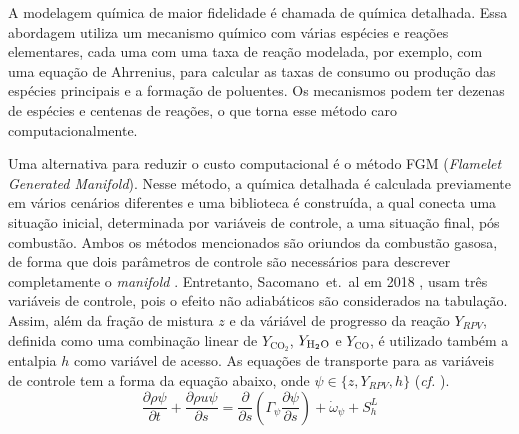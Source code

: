 A modelagem química de maior fidelidade é chamada de química detalhada.
Essa abordagem utiliza um mecanismo químico com várias espécies e reações elementares, cada uma com uma taxa de reação modelada, por exemplo, com uma equação de Ahrrenius, para calcular as taxas de consumo ou produção das espécies principais e a formação de poluentes.
Os mecanismos podem ter dezenas de espécies e centenas de reações, o que torna esse método caro computacionalmente.

Uma alternativa para reduzir o custo computacional é o método FGM (\emph{Flamelet Generated Manifold}). 
Nesse método, a química detalhada é calculada previamente em vários cenários diferentes e uma biblioteca é construída, a qual conecta uma situação inicial, determinada por variáveis de controle, a uma situação final, pós combustão.
Ambos os métodos mencionados são oriundos da combustão gasosa, de forma que dois parâmetros de controle são necessários para descrever completamente o \emph{manifold} \cite{PetersN2000}.
Entretanto, Sacomano~et.~al em 2018 \cite{SacomanoF2018CTM}, usam três variáveis de controle, pois o efeito não adiabáticos  são considerados  na tabulação.
Assim, além da fração de mistura $z$ e da váriável de progresso da reação $Y_{RPV}$,
definida como uma combinação linear de $Y_{\text{CO}_2}$, $ Y_{\text H_2 \text O}$ e $ Y_{\text{CO}}$,
é utilizado também a entalpia $h$ como variável de acesso.
As equações de transporte para as variáveis de controle tem a forma da equação abaixo, onde $\psi \in \lbrace z, Y_{RPV}, h\rbrace$ (\emph{cf.} \cite{SacomanoF2018CTM}).
\begin{equation}
    \frac{\partial \rho\psi}{\partial t} +
    \frac{\partial \rho u \psi}{\partial s} =
    \frac{\partial}{\partial s} \left(
        \Gamma_\psi \frac{\partial \psi}{\partial s}
        \right) +
    \dot\omega_\psi +
    S_h^L
\end{equation} 

